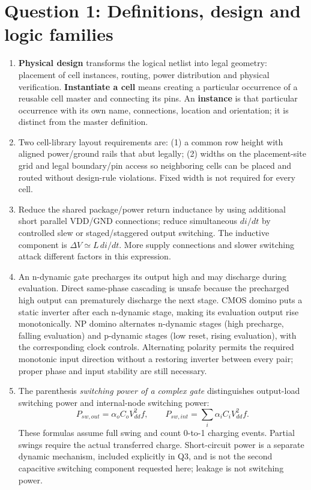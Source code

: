 \documentclass[10pt]{article}
\begin{document}
\section*{Question 1: Definitions, design and logic families}
\begin{enumerate}[label=(\alph*)]
\item \textbf{Physical design} transforms the logical netlist into legal geometry: placement of cell instances, routing, power distribution and physical verification. \textbf{Instantiate a cell} means creating a particular occurrence of a reusable cell master and connecting its pins. An \textbf{instance} is that particular occurrence with its own name, connections, location and orientation; it is distinct from the master definition.
\item Two cell-library layout requirements are: (1) a common row height with aligned power/ground rails that abut legally; (2) widths on the placement-site grid and legal boundary/pin access so neighboring cells can be placed and routed without design-rule violations. Fixed width is not required for every cell.
\item Reduce the shared package/power return inductance by using additional short parallel VDD/GND connections; reduce simultaneous $di/dt$ by controlled slew or staged/staggered output switching. The inductive component is $\Delta V\simeq L\,di/dt$. More supply connections and slower switching attack different factors in this expression.
\item An n-dynamic gate precharges its output high and may discharge during evaluation. Direct same-phase cascading is unsafe because the precharged high output can prematurely discharge the next stage. CMOS domino puts a static inverter after each n-dynamic stage, making its evaluation output rise monotonically. NP domino alternates n-dynamic stages (high precharge, falling evaluation) and p-dynamic stages (low reset, rising evaluation), with the corresponding clock controls. Alternating polarity permits the required monotonic input direction without a restoring inverter between every pair; proper phase and input stability are still necessary.
\item The parenthesis \emph{switching power of a complex gate} distinguishes output-load switching power and internal-node switching power:
\[P_{sw,out}=\alpha_o C_oV_{dd}^2f,\qquad P_{sw,int}=\sum_i\alpha_i C_iV_{dd}^2f.\]
These formulas assume full swing and count 0-to-1 charging events. Partial swings require the actual transferred charge. Short-circuit power is a separate dynamic mechanism, included explicitly in Q3, and is not the second capacitive switching component requested here; leakage is not switching power.

\end{enumerate}
\end{document}
